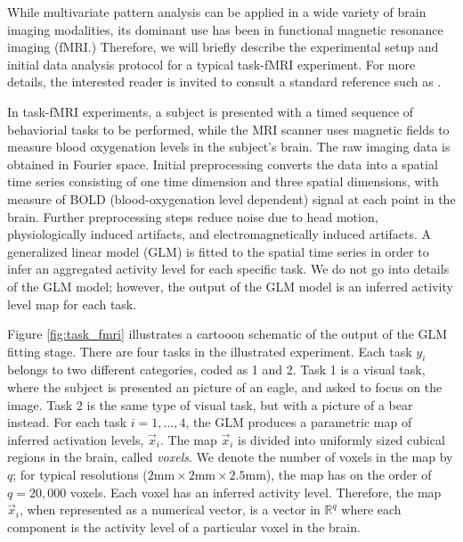 While multivariate pattern analysis can be applied in a wide variety
of brain imaging modalities, its dominant use has been in functional
magnetic resonance imaging (fMRI.)  Therefore, we will briefly
describe the experimental setup and initial data analysis protocol for
a typical task-fMRI experiment.  For more details, the interested
reader is invited to consult a standard reference such as
\cite{poldrack2011handbook}.

In task-fMRI experiments, a subject is presented with a timed sequence
of behaviorial tasks to be performed, while the MRI scanner uses
magnetic fields to measure blood oxygenation levels in the subject's
brain.  The raw imaging data is obtained in Fourier space.  Initial
preprocessing converts the data into a spatial time series consisting
of one time dimension and three spatial dimensions, with measure of
BOLD (blood-oxygenation level dependent) signal at each point in the
brain.  Further preprocessing steps reduce noise due to head motion,
physiologically induced artifacts, and electromagnetically induced
artifacts.  A generalized linear model (GLM) is fitted to the spatial
time series in order to infer an aggregated activity level for each
specific task.  We do not go into details of the GLM model; however,
the output of the GLM model is an inferred activity level map for each
task.

Figure \ref{fig:task_fmri} illustrates a cartooon schematic of the
output of the GLM fitting stage.  There are four tasks in the
illustrated experiment.  Each task $y_i$ belongs to two different
categories, coded as 1 and 2.  Task 1 is a visual task, where the
subject is presented an picture of an eagle, and asked to focus on the
image.  Task 2 is the same type of visual task, but with a picture of
a bear instead.  For each task $i=1,\hdots, 4$, the GLM produces a
parametric map of inferred activation levels, $\vec{x}_i$.  The map
$\vec{x}_i$ is divided into uniformly sized cubical regions in the
brain, called \emph{voxels}.  We denote the number of voxels in the
map by $q$; for typical resolutions ($2\text{mm} \times 2 \text{mm}
\times 2.5 \text{mm}$), the map has on the order of $q = 20,000$
voxels.  Each voxel has an inferred activity level.  Therefore, the
map $\vec{x}_i$, when represented as a numerical vector, is a vector
in $\mathbb{R}^q$ where each component is the activity level of a
particular voxel in the brain.


